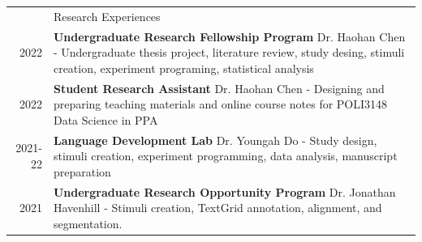 \documentclass[letterpaper, 11pt]{article}
\newcommand{\headingfont}{\Large\color{MidnightBlue}}
\newenvironment{SectionTable}[1]{
	\renewcommand*{\arraystretch}{1.7}
	\setlength{\tabcolsep}{10pt}
	\begin{longtable}{Rp{6.3in}} & #1 \\}
{\end{longtable}\vspace{-.3cm}}
\begin{document}
\begin{SectionTable}{\headingfont Research Experiences}
2022 &
\textbf{Undergraduate Research Fellowship Program} \hfill Dr. Haohan Chen \newline 
	- Undergraduate thesis project, literature review, study desing, stimuli creation, experiment programing, statistical analysis\\
	2022&
	\textbf{Student Research Assistant} \hfill Dr. Haohan Chen \newline
	- Designing and preparing teaching materials and online course notes for POLI3148 Data Science in PPA\\

	2021-22&
	\textbf{Language Development Lab} \hfill Dr. Youngah Do \newline
	- Study design, stimuli creation, experiment programming, data analysis, manuscript preparation \\


2021 &
\textbf{Undergraduate Research Opportunity Program} \hfill Dr. Jonathan Havenhill\newline
	- Stimuli creation, TextGrid annotation, alignment, and segmentation.\\


	\end{SectionTable}
\end{document}
